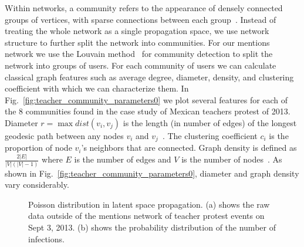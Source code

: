 Within networks, a community refers to the appearance of densely connected groups of vertices, with sparse connections between each group~\cite{newman2006modularity}.
Instead of treating the whole network as a single propagation space,
we use network structure to further split the network into communities.
For our mentions network we use the Louvain method~\cite{blondel2008fast} for community detection to split the network into groups of users. For each community of users we can calculate classical graph features such as average degree, diameter, density, and clustering coefficient with which we can characterize them. In Fig.~\ref{fig:teacher_community_parameters0} we plot several features for each of the 8 communities found in the case study of Mexican teachers protest of 2013. Diameter $r = \max dist(v_i, v_j)$ is the length (in number of edges) of the longest geodesic path between any nodes $v_i$ and $v_j$~\cite{newman2003structure}. The clustering coefficient $c_i$ is the proportion of node $v_i$'s neighbors that are connected. Graph density is defined as $\frac{2|E|}{|V|(|V|-1)}$ where $E$ is the number of edges and $V$ is the
number of nodes~\cite{scott2011sage}. As shown in Fig.~\ref{fig:teacher_community_parameters0}, diameter and graph density vary considerably.


\begin{figure}[t]
\centering
{}
\caption{Poisson distribution in latent space propagation. (a) shows the raw data outside of the mentions network of teacher protest events on Sept 3, 2013. (b) shows the probability distribution of the number of
infections.}
\label{fig:Poisson}
\end{figure}






